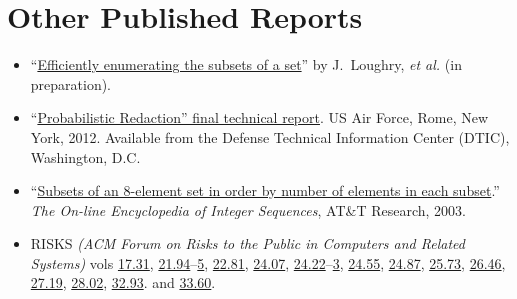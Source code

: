 \section*{Other Published Reports}
\vspace{-3mm}

\begin{itemize}
	\item ``\href{http://www.cnadocs.com/papers/subset.pdf}%
{Efficiently enumerating the subsets of a set}'' by J.\ Loughry,
{\it et al.} (in preparation).\vspace{-2.5mm}

	\item ``\href{http://cnadocs.com/papers/Loughry2011.pdf}%
{Probabilistic Redaction'' final technical report}. US Air Force, Rome,
New York, 2012. Available from the Defense Technical Information Center
(DTIC), Washington, D.C.\vspace{-2.5mm}

	\item ``\href{http://oeis.org/A047869}{Subsets of an 8-element set
		in order by number of elements in each subset}.'' \emph{The On-line
		Encyclopedia of Integer Sequences}, AT\&T Research, 2003.\vspace{-2.5mm}

	\item RISKS \emph{(ACM Forum on Risks to the Public in Computers
		and Related Systems)} vols
		\href{http://catless.ncl.ac.uk/Risks/17.31.html}{17.31},
		\href{http://catless.ncl.ac.uk/Risks/21.94.html}{21.94}--\href{http://catless.ncl.ac.uk/Risks/21.95.html}{5},
		\href{http://catless.ncl.ac.uk/Risks/21.81.html}{22.81},
		\href{http://catless.ncl.ac.uk/Risks/24.07.html}{24.07},
		\href{http://catless.ncl.ac.uk/Risks/24.22.html}{24.22}--\href{http://catless.ncl.ac.uk/Risks/24.23.html}{3},
		\href{http://catless.ncl.ac.uk/Risks/24.55.html}{24.55},
		\href{http://catless.ncl.ac.uk/Risks/24.87.html}{24.87},
		\href{http://catless.ncl.ac.uk/Risks/25.73.html}{25.73},
		\href{http://catless.ncl.ac.uk/Risks/26.46.html}{26.46},
		\href{http://catless.ncl.ac.uk/Risks/27.19.html}{27.19},
		\href{http://catless.ncl.ac.uk/Risks/28.02.html}{28.02},
		\href{http://catless.ncl.ac.uk/Risks/32.93.html}{32.93}.
		and \href{http://catless.ncl.ac.uk/Risks/33.60.html}{33.60}.
\end{itemize}


